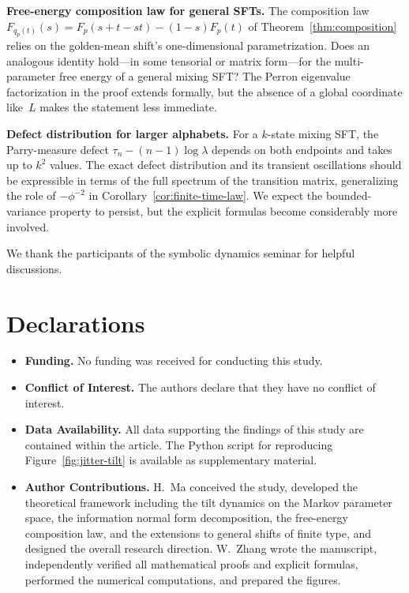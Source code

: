 \documentclass[pdflatex,sn-basic,Numbered]{sn-jnl}
\theoremstyle{thmstyleone}
\theoremstyle{thmstyletwo}
\theoremstyle{thmstylethree}
\begin{document}
\medskip
\noindent\textbf{Free-energy composition law for general SFTs.}
The composition law $F_{q_p(t)}(s)=F_p(s+t-st)-(1-s)F_p(t)$ of Theorem~\ref{thm:composition} relies on the golden-mean shift's one-dimensional parametrization. Does an analogous identity hold---in some tensorial or matrix form---for the multi-parameter free energy of a general mixing SFT? The Perron eigenvalue factorization in the proof extends formally, but the absence of a global coordinate like~$L$ makes the statement less immediate.

\medskip
\noindent\textbf{Defect distribution for larger alphabets.}
For a $k$-state mixing SFT, the Parry-measure defect $\tau_n-(n-1)\log\lambda$ depends on both endpoints and takes up to $k^2$ values. The exact defect distribution and its transient oscillations should be expressible in terms of the full spectrum of the transition matrix, generalizing the role of $-\phi^{-2}$ in Corollary~\ref{cor:finite-time-law}. We expect the bounded-variance property to persist, but the explicit formulas become considerably more involved.

\backmatter


We thank the participants of the symbolic dynamics seminar for helpful discussions.

\section*{Declarations}

\begin{itemize}
\item \textbf{Funding.} No funding was received for conducting this study.
\item \textbf{Conflict of Interest.} The authors declare that they have no conflict of interest.
\item \textbf{Data Availability.} All data supporting the findings of this study are contained within the article. The Python script for reproducing Figure~\ref{fig:jitter-tilt} is available as supplementary material.
\item \textbf{Author Contributions.} H.~Ma conceived the study, developed the theoretical framework including the tilt dynamics on the Markov parameter space, the information normal form decomposition, the free-energy composition law, and the extensions to general shifts of finite type, and designed the overall research direction. W.~Zhang wrote the manuscript, independently verified all mathematical proofs and explicit formulas, performed the numerical computations, and prepared the figures.
\end{itemize}
\end{document}
